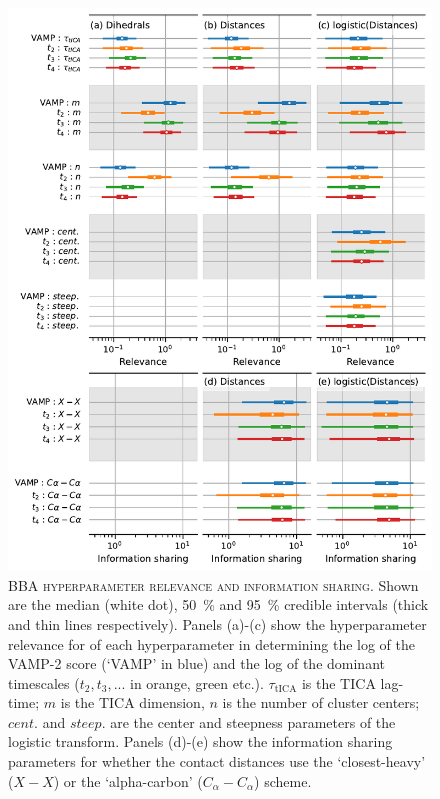 \documentclass{article}
\begin{document}
\begin{figure}
    \centering
    \includegraphics[height=0.8\textheight]{figures/sensitivities/1fme_sensitivity.pdf}
    \caption{\textsc{BBA hyperparameter relevance and information sharing}. Shown are the  median (white dot), \SI{50}{\percent} and \SI{95}{\percent} credible intervals (thick and thin lines respectively).  Panels (a)-(c) show the hyperparameter relevance for of each hyperparameter in determining the log of the VAMP-2 score (`VAMP' in blue) and the log of the dominant timescales ($t_{2}, t_{3}, ...$ in orange, green etc.). $\tau_{\mathrm{tICA}}$ is the TICA lag-time; $m$ is the TICA dimension, $n$ is the number of cluster centers; $cent.$ and $steep.$ are the center and steepness parameters of the logistic transform. Panels (d)-(e) show the information sharing parameters for whether the contact distances use the `closest-heavy' ($X-X$) or the `alpha-carbon' ($C_{\alpha}-C_{\alpha}$) scheme.  }
    \label{fig:1fme_sense}
\end{figure}
\end{document}
